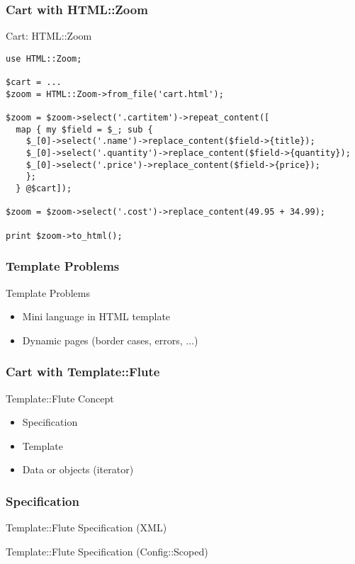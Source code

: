 \subsubsection{Cart with HTML::Zoom}
\begin{frame}[fragile]{Cart: HTML::Zoom}
\begin{lstlisting}
use HTML::Zoom;

$cart = ...
$zoom = HTML::Zoom->from_file('cart.html');

$zoom = $zoom->select('.cartitem')->repeat_content([
  map { my $field = $_; sub {
    $_[0]->select('.name')->replace_content($field->{title});
    $_[0]->select('.quantity')->replace_content($field->{quantity});
    $_[0]->select('.price')->replace_content($field->{price});
    };
  } @$cart]);

$zoom = $zoom->select('.cost')->replace_content(49.95 + 34.99);

print $zoom->to_html();
\end{lstlisting}
\end{frame}
\subsubsection{Template Problems}
\begin{frame}{Template Problems}
 \begin{itemize}
  \item Mini language in HTML template
  \item Dynamic pages (border cases, errors, ...)
 \end{itemize}
\end{frame}
\subsubsection{Cart with Template::Flute}
\begin{frame}{Template::Flute Concept}
 \begin{itemize}
  \item Specification
  \item Template
  \item Data or objects (iterator)
 \end{itemize}
\end{frame}
\subsubsection{Specification}
\begin{frame}[fragile]{Template::Flute Specification (XML)}

\end{frame}
\begin{frame}[fragile]{Template::Flute Specification (Config::Scoped)}

\end{frame}
